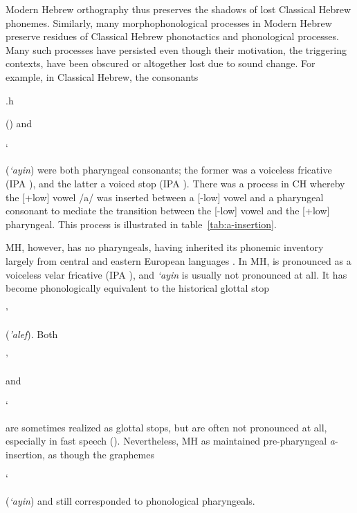 Modern Hebrew orthography thus preserves the shadows of lost Classical Hebrew phonemes. Similarly, many morphophonological processes in Modern Hebrew
preserve residues of Classical Hebrew phonotactics and phonological processes. Many such processes have persisted 
even though their motivation, the triggering contexts, 
have been obscured or altogether lost due to sound change. 
For example, in Classical Hebrew, the consonants \begin{cjhebrew}.h\end{cjhebrew} 
(\textit{}) and \begin{cjhebrew}`\end{cjhebrew}
(\textit{`ayin}) 
were both pharyngeal consonants; the former was a voiceless fricative
(IPA \textipa{[\textcrh]}), and the latter a voiced stop (IPA \textipa{[Q]}). There was a process in CH whereby the 
[+low] vowel /a/ was inserted between a [-low] vowel and a pharyngeal consonant to
mediate the transition between the [-low] vowel and the [+low] pharyngeal.
This process is illustrated in table~\ref{tab:a-insertion}. 

MH, however, has no pharyngeals, having inherited its phonemic inventory 
largely from central and eastern European languages \citep{montoya:2014}. In MH, \textipa{[\textcrh]} 
is pronounced as a voiceless velar fricative (IPA \textipa{[x]}), and \textit{`ayin} 
is usually not pronounced at all. It has become phonologically 
equivalent to the historical glottal stop 
\begin{cjhebrew}'\end{cjhebrew} (\textit{'alef}). 
Both \begin{cjhebrew}'\end{cjhebrew} and \begin{cjhebrew}`\end{cjhebrew} 
are sometimes realized as glottal stops, but are often not pronounced at all, 
especially in fast speech (\citep{matras-and-schifff:2005,berman:1985}). Nevertheless,
MH as maintained pre-pharyngeal \textit{a}-insertion, as though the graphemes 
\begin{cjhebrew}`\end{cjhebrew} (\textit{`ayin}) and \textit{} 
still corresponded to phonological pharyngeals.

